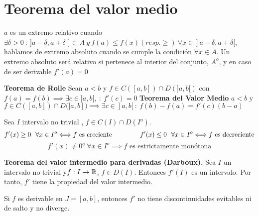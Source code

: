 \section{Teorema del valor medio}
$a$ es un extremo relativo cuando $\exists\delta>0 \ : \ ]a-\delta, a+\delta[\subset A \ y \  f(a)\leq f(x) (resp. \geq) \ \forall x\in ]a-\delta, a+\delta[$, hablamos de extremo absoluto cuando se cumple la condición $\forall x\in A$. Un extremo absoluto será relativo si pertenece al interior del conjunto, $A^o$, y en caso de ser derivable $f'(a) = 0$

\textbf{Teorema de Rolle}
Sean $a<b$ y $f\in C([a,b])\cap D(]a,b[)$ con $f(a) = f(b)\implies\exists c\in ]a,b[, \ : \ f'(c) =0$
\textbf{Teorema del Valor Medio} 
$a<b$ y $f\in C([a,b])\cap D(]a,b[) \implies\exists c\in ]a, b[ \ : \ f(b)-f(a)=f'(c)(b-a)$

Sea $I$ intervalo no trivial
, $f\in C(I)\cap D(I^o)$.
$$ f'(x)\geq 0 \ \ \forall x\in I^o\Longleftrightarrow f \text{ es creciente} \hspace{1.5cm}
f'(x)\leq 0 \ \ \forall x\in I^o\Longleftrightarrow f \text{ es decreciente} $$
$$ f'(x)\not =0 º \ \forall x\in I^o \implies f \text{ es estrictamente monótona} $$

\textbf{Teorema del valor intermedio para derivadas (Darboux).} Sea $I$ un intervalo no trivial y$f:I\rightarrow\mathbb{R}$, $f\in D(I)$. Entonces $f'(I)$ es un intervalo. Por tanto, $f'$ tiene la propiedad del valor intermedio.

Si $f$ es derivable en $J=[a,b]$, entonces $f'$ no tiene discontinuidades evitables ni de salto y no diverge.